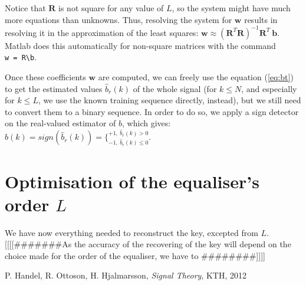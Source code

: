 \documentclass[twocolumn, 12pt]{IEEEtran}
\begin{document}
Notice that $\bm{R}$ is not square for any value of $L$, so the system might have much more equations than unknowns. Thus, resolving the system for $\bm{w}$ results in resolving it in the approximation of the least squares: $\bm{w} \approx (\bm{R}^{T}\bm{R})^{-1}\bm{R}^{T}~\bm{b}$. Matlab does this automatically for non-square matrices with the command \texttt{w~=~R\textbackslash b}.

Once these coefficients $\bm{w}$ are computed, we can freely use the equation (\ref{eq:bt}) to get the estimated values $\hat{b}_{r}(k)$ of the whole signal (for $k \leq N$, and especially for $k \leq L$, we use the known training sequence directly, instead), but we still need to convert them to a binary sequence. In order to do so, we apply a sign detector on the real-valued estimator of $b$, which gives: $\hat{b}(k) = sign(\hat{b}_{r}(k)) = \{_{-1,~\hat{b}_{r}(k) \leq 0}^{+1,~\hat{b}_{r}(k) > 0}$.

\section{Optimisation of the equaliser's order $L$}
We have now everything needed to reconstruct the key, excepted from $L$. [[[[\#\#\#\#\#\#\#As the accuracy of the recovering of the key will depend on the choice made for the order of the equaliser, we have to \#\#\#\#\#\#\#\#]]]]





\begin{thebibliography}{1}

P. Handel, R. Ottoson, H. Hjalmarsson, \emph{Signal Theory}, KTH, 2012

\end{thebibliography}

\balance
\end{document}
